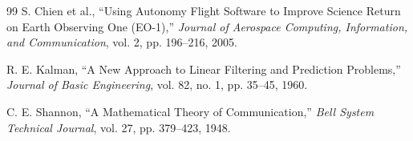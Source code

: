 \documentclass[11pt,a4paper]{article}
\begin{document}
\begin{thebibliography}{99}
S. Chien et al.,
``Using Autonomy Flight Software to Improve Science Return on Earth
Observing One (EO-1),''
\emph{Journal of Aerospace Computing, Information, and
Communication}, vol. 2, pp. 196--216, 2005.

R. E. Kalman,
``A New Approach to Linear Filtering and Prediction Problems,''
\emph{Journal of Basic Engineering},
vol. 82, no. 1, pp. 35--45, 1960.

C. E. Shannon,
``A Mathematical Theory of Communication,''
\emph{Bell System Technical Journal},
vol. 27, pp. 379--423, 1948.

\end{thebibliography}
\end{document}
